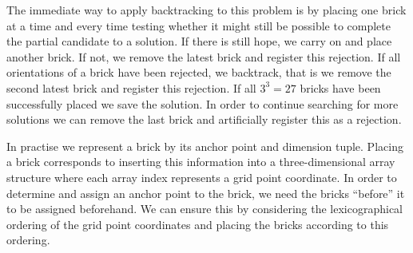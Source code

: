The immediate way to apply backtracking to this problem is by placing one brick at a time and every time testing whether it might still be possible to complete the partial candidate to a solution. If there is still hope, we carry on and place another brick. If not, we remove the latest brick and register this rejection. If all orientations of a brick have been rejected, we backtrack, that is we remove the second latest brick and register this rejection. If all $3^3 = 27$ bricks have been successfully placed we save the solution. In order to continue searching for more solutions we can remove the last brick and artificially register this as a rejection.

In practise we represent a brick by its anchor point and dimension tuple. Placing a brick corresponds to inserting this information into a three-dimensional array structure where each array index represents a grid point coordinate. In order to determine and assign an anchor point to the brick, we need the bricks ``before'' it to be assigned beforehand. We can ensure this by considering the lexicographical ordering of the grid point coordinates and placing the bricks according to this ordering.
